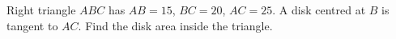 Right triangle $ABC$ has $AB=15$, $BC=20$, $AC=25$. A disk centred at $B$ is tangent to $AC$. Find the disk area inside the triangle.
